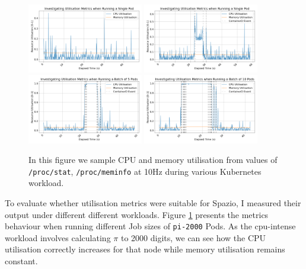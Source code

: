 \begin{figure}[H]
    \centering
    \includegraphics[width=0.45\textwidth]{images/utilisation-baseline.png}
    \includegraphics[width=0.45\textwidth]{images/utilisation-single.png} \\
    \includegraphics[width=0.45\textwidth]{images/utilisation-smallbatch.png}
    \includegraphics[width=0.45\textwidth]{images/utilisation-bigbatch.png}
    \caption{In this figure we sample CPU and memory utilisation from
    values of \texttt{/proc/stat}, \texttt{/proc/meminfo} at 10Hz during various Kubernetes workload.}
    \label{fig:utilisation-eval}
\end{figure}

To evaluate whether utilisation metrics were suitable for Spazio, I measured
their output under different different workloads. Figure
\ref{fig:utilisation-eval} presents the metrics behaviour when running different
Job sizes of \verb|pi-2000| Pods. As the cpu-intense workload involves
calculating $\pi$ to 2000 digits, we can see how the CPU utilisation correctly
increases for that node while memory utilisation remains constant.

